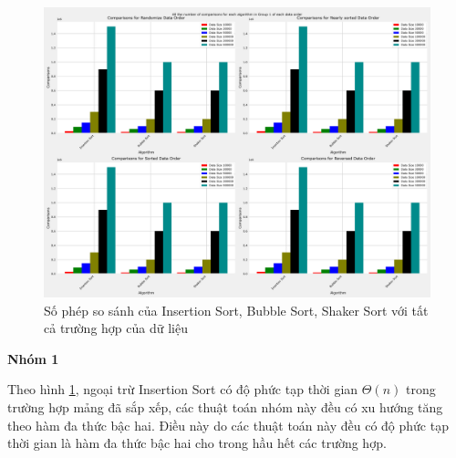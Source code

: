 \begin{figure}[H]
    \centering
    \includegraphics[width=\textwidth]{experimental_result/images/all_the_number_of_comparisons_for_each_algorithm_in_group_1_of_each_data_order.png}
    \caption{Số phép so sánh của Insertion Sort, Bubble Sort, Shaker Sort với tất cả trường hợp của dữ liệu}
    \label{fig:all_the_number_of_comparisons_for_each_algorithm_in_group_1_of_each_data_order}
\end{figure}

\textbf{Nhóm 1}

Theo hình \ref{fig:all_the_number_of_comparisons_for_each_algorithm_in_group_1_of_each_data_order}, ngoại trừ Insertion Sort có độ phức tạp thời gian $\Theta(n)$ trong trường hợp mảng đã sắp xếp, các thuật toán nhóm này đều có xu hướng tăng theo hàm đa thức bậc hai. Điều này do các thuật toán này đều có độ phức tạp thời gian là hàm đa thức bậc hai cho trong hầu hết các trường hợp. 



